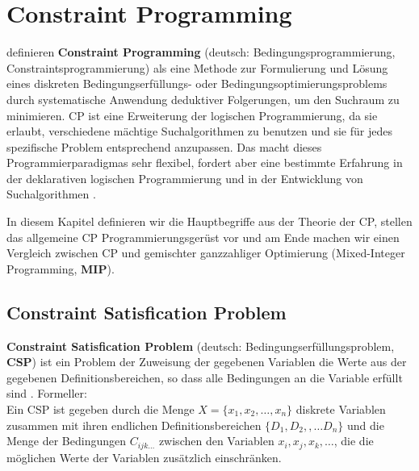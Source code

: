 \chapter{Constraint Programming}
\label{sec:CP}

\cite{CPforScheduling} definieren {\bf Constraint Programming} (deutsch: Bedingungsprogrammierung, Constraintsprogrammierung) als eine Methode zur Formulierung und Lösung eines diskreten Bedingungserfüllungs- oder Bedingungsoptimierungsproblems durch systematische Anwendung deduktiver Folgerungen, um den Suchraum zu minimieren. CP ist eine Erweiterung der logischen Programmierung, da sie erlaubt,  verschiedene mächtige Suchalgorithmen zu benutzen und sie für jedes spezifische Problem entsprechend anzupassen. Das macht dieses Programmierparadigmas sehr flexibel, fordert aber eine bestimmte Erfahrung in der deklarativen logischen Programmierung und in der Entwicklung von Suchalgorithmen \citep[vgl][]{CPforScheduling}.

In diesem Kapitel definieren wir die Hauptbegriffe aus der Theorie der CP, stellen das allgemeine CP Programmierungsgerüst vor und am Ende machen wir einen Vergleich zwischen CP und gemischter ganzzahliger Optimierung (Mixed-Integer Programming, {\bf MIP}).

\section{Constraint Satisfication Problem}

{\bf Constraint Satisfication Problem} (deutsch: Bedingungserfüllungsproblem, {\bf CSP}) ist ein Problem der Zuweisung der gegebenen Variablen die Werte aus der gegebenen Definitionsbereichen, so dass alle Bedingungen an die Variable erfüllt sind \citep[vgl][]{CSP}. Formeller:\\
Ein CSP ist gegeben durch die Menge $X= \{ x_1,x_2,\dots, x_n\}$ diskrete Variablen zusammen mit ihren endlichen Definitionsbereichen $\{ D_1,D_2,,\dots D_n\}$ und die Menge der Bedingungen $C_{ijk\dots}$ zwischen den Variablen $x_i, x_j, x_k, \dots$, die die möglichen Werte der Variablen zusätzlich einschränken. 


